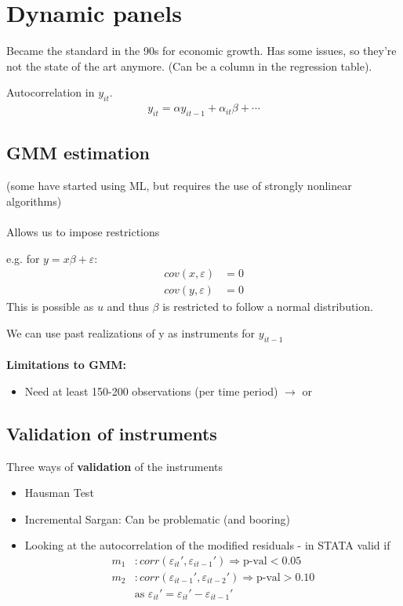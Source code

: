 \section{Dynamic panels} %
\begin{multicols}{2}
 Became the standard in the 90s for economic growth. Has some issues, so they're not the state of the art anymore. (Can be a column in the regression table).

 Autocorrelation in $y_{it}$.
 \begin{align*}
  y_{it} = \alpha y_{it-1}+\alpha_{it}\beta+\cdots
 \end{align*}

 \subsection{GMM estimation}
 (some have started using ML, but requires the use of strongly nonlinear algorithms)
 \\ \\
 Allows us to impose restrictions\par
 e.g. for $y=x\beta+\varepsilon$:
 \begin{align*}
  cov(x,\varepsilon) & =0 \\
  cov(y,\varepsilon) & =0
 \end{align*}
 This is possible as $u$ and thus $\beta$ is restricted to follow a normal distribution.

 We can use past realizations of y as instruments for $y_{it-1}$
 \\ \\
 \textbf{Limitations to GMM:}
 \begin{itemize}
  \item Need at least 150-200 observations (per time period) $\rightarrow$ or
 \end{itemize}

 \subsection{Validation of instruments}
 Three ways of \textbf{validation} of the instruments
 \begin{itemize}
  \item Hausman Test
  \item Incremental Sargan: Can be problematic (and booring)
  \item Looking at the autocorrelation of the modified residuals - in STATA valid if
        \begin{align*}
         m_1 & : corr(\varepsilon_{it}',\varepsilon_{it-1}')\Rightarrow \text{p-val}<0.05   \\
         m_2 & : corr(\varepsilon_{it-1}',\varepsilon_{it-2}')\Rightarrow \text{p-val}>0.10 \\
             & \text{as }\varepsilon_{it}'=\varepsilon_{it}'-\varepsilon_{it-1}'
        \end{align*}
 \end{itemize}


\end{multicols}
